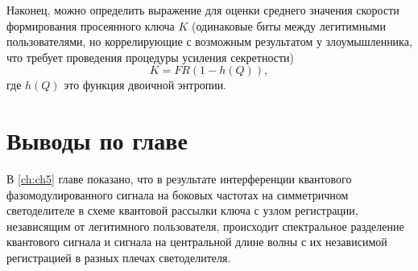 Наконец, можно определить выражение для оценки среднего значения скорости формирования просеянного ключа $K$ (одинаковые биты между легитимными пользователями, но коррелирующие с возможным результатом у злоумышленника, что требует проведения процедуры усиления секретности)
\begin{equation}
    K=FR(1-h(Q)),
\end{equation}
где $h(Q)$ это функция двоичной энтропии. 

\pagebreak

\section{Выводы по главе} \label{ch:ch5/sec9}


В \ref{ch:ch5} главе показано, что в результате интерференции квантового фазомодулированного сигнала на боковых частотах на симметричном светоделителе в схеме квантовой рассылки ключа с узлом регистрации, независящим от легитимного пользователя, происходит спектральное разделение квантового сигнала и сигнала на центральной длине волны с их независимой регистрацией в разных плечах светоделителя. 

\pagebreak
